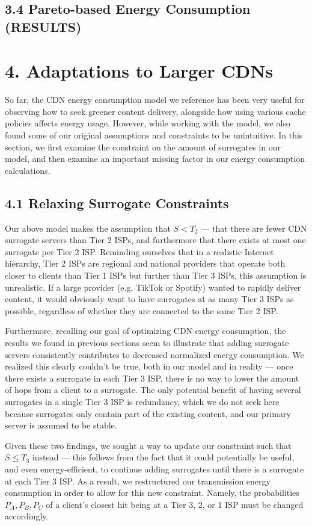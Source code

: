 \documentclass[
	a4paper, %
	10pt, %
	unnumberedsections, %
	twoside, %
]{LTJournalArticle}
\begin{document}
\subsection{3.4 Pareto-based Energy Consumption (RESULTS)}

\section{4. Adaptations to Larger CDNs}
So far, the CDN energy consumption model we reference has been very useful for observing how to seek greener content delivery, alongside how using various cache policies affects energy usage. However, while working with the model, we also found some of our original assumptions and constraints to be unintuitive. In this section, we first examine the constraint on the amount of surrogates in our model, and then examine an important missing factor in our energy consumption calculations.

\subsection{4.1 Relaxing Surrogate Constraints}
Our above model makes the assumption that $S < T_2$ --- that there are fewer CDN surrogate servers than Tier 2 ISPs, and furthermore that there exists at most one surrogate per Tier 2 ISP. Reminding ourselves that in a realistic Internet hierarchy, Tier 2 ISPs are regional and national providers that operate both closer to clients than Tier 1 ISPs but further than Tier 3 ISPs, this assumption is unrealistic. If a large provider (e.g. TikTok or Spotify) wanted to rapidly deliver content, it would obviously want to have surrogates at as many Tier 3 ISPs as possible, regardless of whether they are connected to the same Tier 2 ISP. 

Furthermore, recalling our goal of optimizing CDN energy consumption, the results we found in previous sections seem to illustrate that adding surrogate servers consistently contributes to decreased normalized energy consumption. We realized this clearly couldn't be true, both in our model and in reality --- once there exists a surrogate in each Tier 3 ISP, there is no way to lower the amount of hops from a client to a surrogate. The only potential benefit of having several surrogates in a single Tier 3 ISP is redundancy, which we do not seek here because surrogates only contain part of the existing content, and our primary server is assumed to be stable. 

Given these two findings, we sought a way to update our constraint such that $S \leq T_3$ instead --- this follows from the fact that it could potentially be useful, and even energy-efficient, to continue adding surrogates until there is a surrogate at each Tier 3 ISP. As a result, we restructured our transmission energy consumption in order to allow for this new constraint. Namely, the probabilities $P_A, P_B, P_C$ of a client's closest hit being at a Tier 3, 2, or 1 ISP must be changed accordingly. 
\end{document}
